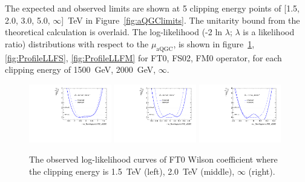 The expected and observed limits are shown at 5 clipping energy points of [1.5, 2.0, 3.0, 5.0, $\infty$]~TeV in Figure~\ref{fig:aQGClimits}.
The unitarity bound from the theoretical calculation \cite{PhysRevD.101.113003} is overlaid.
The log-likelihood (-2 ln $\lambda$; $\lambda$ is a likelihood ratio) distributions with respect to the $\mu_\mathrm{aQGC}$, is shown in figure~\ref{fig:ProfileLL},\ref{fig:ProfileLLFS}, \ref{fig:ProfileLLFM} for FT0, FS02, FM0 operator, for each clipping energy of 1500~GeV, 2000~GeV, $\infty$.
\begin{figure}[ht]
    \centering
    \includegraphics[width=0.32\textwidth]{figures/aQGC/profileFT01500}
    	\includegraphics[width=0.32\textwidth]{figures/aQGC/profileFT02000}
        \includegraphics[width=0.32\textwidth]{figures/aQGC/profileFT0inf}
        \caption{The observed log-likelihood curves of FT0 Wilson coefficient where the clipping energy is 1.5~TeV (left), 2.0~TeV (middle), $\infty$ (right).}
        \label{fig:ProfileLL}
\end{figure}
